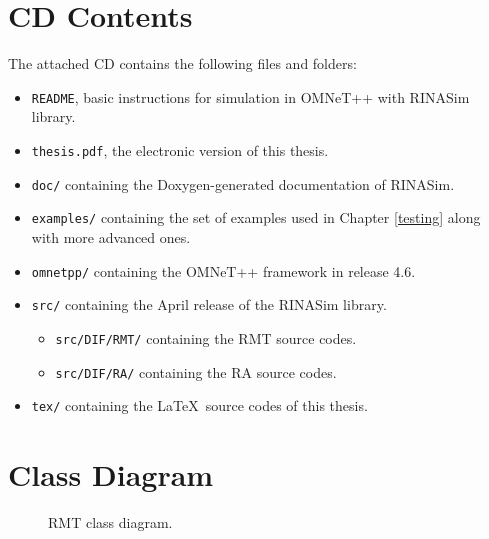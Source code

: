 \chapter{CD Contents}
    The attached CD contains the following files and folders:

    \begin{itemize}
        \item \texttt{README}, basic instructions for simulation in OMNeT++ with RINASim library.
        \item \texttt{thesis.pdf}, the electronic version of this thesis.
        \item \texttt{doc/} containing the Doxygen-generated documentation of RINASim.
        \item \texttt{examples/} containing the set of examples used in Chapter \ref{testing} along with more advanced ones.
        \item \texttt{omnetpp/} containing the OMNeT++ framework in release 4.6.
        \item \texttt{src/} containing the April release of the RINASim library.
        \begin{itemize}
            \item \texttt{src/DIF/RMT/} containing the RMT source codes.
            \item \texttt{src/DIF/RA/} containing the RA source codes.
        \end{itemize}
        \item \texttt{tex/} containing the \LaTeX~source codes of this thesis.
    \end{itemize}

\chapter{Class Diagram}\label{appendix:class}
    \newpage
    \begin{figure}[H]
        \begin{center}
          \caption{RMT class diagram.}
          \label{fig:rinasim:rmt-erd}
        \end{center}
    \end{figure}
